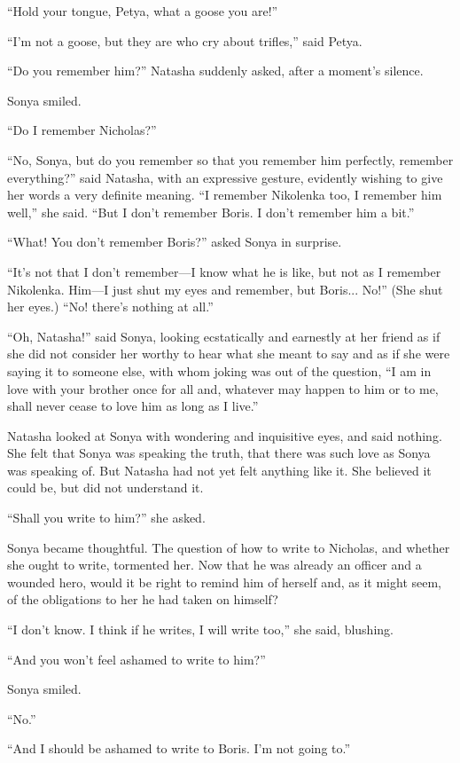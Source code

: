 ``Hold your tongue, Petya, what a goose you are!''

``I'm not a goose, but they are who cry about trifles,'' said
Petya.

``Do you remember him?'' Natasha suddenly asked, after a moment's
silence.

Sonya smiled.

``Do I remember Nicholas?''

``No, Sonya, but do you remember so that you remember him
perfectly, remember everything?'' said Natasha, with an
expressive gesture, evidently wishing to give her words a very
definite meaning. ``I remember Nikolenka too, I remember him
well,'' she said. ``But I don't remember Boris. I don't remember
him a bit.''

``What! You don't remember Boris?'' asked Sonya in surprise.

``It's not that I don't remember---I know what he is like, but
not as I remember Nikolenka. Him---I just shut my eyes and
remember, but Boris...  No!'' (She shut her eyes.) ``No! there's
nothing at all.''

``Oh, Natasha!'' said Sonya, looking ecstatically and earnestly
at her friend as if she did not consider her worthy to hear what
she meant to say and as if she were saying it to someone else,
with whom joking was out of the question, ``I am in love with
your brother once for all and, whatever may happen to him or to
me, shall never cease to love him as long as I live.''

Natasha looked at Sonya with wondering and inquisitive eyes, and
said nothing. She felt that Sonya was speaking the truth, that
there was such love as Sonya was speaking of. But Natasha had not
yet felt anything like it. She believed it could be, but did not
understand it.

``Shall you write to him?'' she asked.

Sonya became thoughtful. The question of how to write to
Nicholas, and whether she ought to write, tormented her. Now that
he was already an officer and a wounded hero, would it be right
to remind him of herself and, as it might seem, of the
obligations to her he had taken on himself?

``I don't know. I think if he writes, I will write too,'' she
said, blushing.

``And you won't feel ashamed to write to him?''

Sonya smiled.

``No.''

``And I should be ashamed to write to Boris. I'm not going to.''

